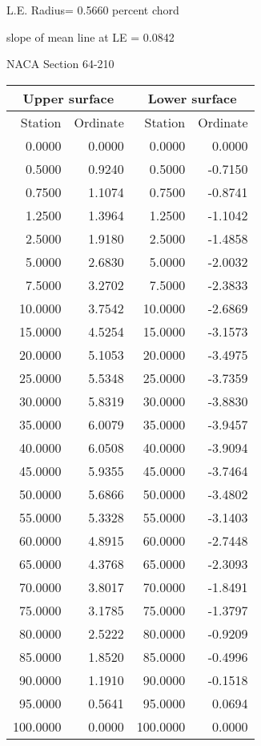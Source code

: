 \documentclass[11pt]{book}
\begin{document}
L.E. Radius=  0.5660 percent chord


 slope of mean line at LE =  0.0842
 \newpage
  \label{s64-210}
 \begin{Large}
 NACA Section 64-210
 \end{Large}
  
 \vspace{8mm}
 \begin{tabular}{|r|r|r|r|} \hline 
 \multicolumn{2}{|c|}{Upper surface} & \multicolumn{2}{|c|}{Lower surface} \\
 \hline
 Station & Ordinate & Station & Ordinate \\
 \hline
0.0000 & 0.0000 & 0.0000 & 0.0000 \\
0.5000 & 0.9240 & 0.5000 & -0.7150 \\
0.7500 & 1.1074 & 0.7500 & -0.8741 \\
1.2500 & 1.3964 & 1.2500 & -1.1042 \\
2.5000 & 1.9180 & 2.5000 & -1.4858 \\
5.0000 & 2.6830 & 5.0000 & -2.0032 \\
7.5000 & 3.2702 & 7.5000 & -2.3833 \\
10.0000 & 3.7542 & 10.0000 & -2.6869 \\
15.0000 & 4.5254 & 15.0000 & -3.1573 \\
20.0000 & 5.1053 & 20.0000 & -3.4975 \\
25.0000 & 5.5348 & 25.0000 & -3.7359 \\
30.0000 & 5.8319 & 30.0000 & -3.8830 \\
35.0000 & 6.0079 & 35.0000 & -3.9457 \\
40.0000 & 6.0508 & 40.0000 & -3.9094 \\
45.0000 & 5.9355 & 45.0000 & -3.7464 \\
50.0000 & 5.6866 & 50.0000 & -3.4802 \\
55.0000 & 5.3328 & 55.0000 & -3.1403 \\
60.0000 & 4.8915 & 60.0000 & -2.7448 \\
65.0000 & 4.3768 & 65.0000 & -2.3093 \\
70.0000 & 3.8017 & 70.0000 & -1.8491 \\
75.0000 & 3.1785 & 75.0000 & -1.3797 \\
80.0000 & 2.5222 & 80.0000 & -0.9209 \\
85.0000 & 1.8520 & 85.0000 & -0.4996 \\
90.0000 & 1.1910 & 90.0000 & -0.1518 \\
95.0000 & 0.5641 & 95.0000 & 0.0694 \\
100.0000 & 0.0000 & 100.0000 & 0.0000 \\
 \hline 
 \end{tabular}
\end{document}

